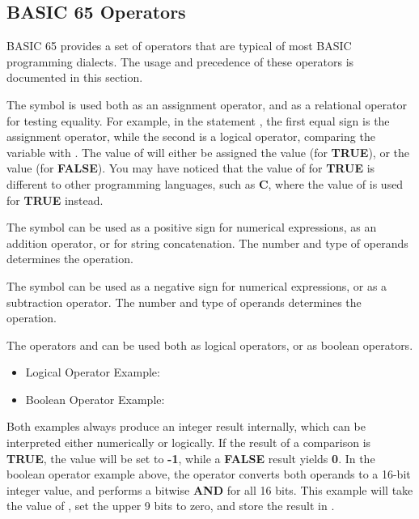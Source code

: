 \subsection{BASIC 65 Operators}

BASIC 65 provides a set of operators that are typical of most BASIC
programming dialects. The usage and precedence of these operators is documented in this section.

The \screentext{=} symbol is used both as an assignment operator, and as a relational
operator for testing equality. For example, in the statement
, the first equal sign is the assignment operator,
while the second is a logical operator, comparing the variable  with .
The value of  will either be assigned the value  (for {\bf TRUE}), or
the value  (for {\bf FALSE}).
You may have noticed that the value of  for {\bf TRUE} is different to
other programming languages, such as {\bf C}, where the value of 
is used for {\bf TRUE} instead.

The \screentext{+} symbol can be used as a positive sign for numerical expressions,
as an addition operator, or for string concatenation. The number and type of operands
determines the operation.

The \screentext{-} symbol can be used as a negative sign for numerical expressions,
or as a subtraction operator. The number and type of operands
determines the operation.

The operators  and  can be used both as
logical operators, or as boolean operators.

\begin{itemize}
  \item Logical Operator Example: 
  \item Boolean Operator Example: 
\end{itemize}

Both examples always produce an integer result internally, which can be interpreted
either numerically or logically.
If the result of a comparison is {\bf TRUE}, the value will be set
to {\bf -1}, while a {\bf FALSE} result yields {\bf 0}.
In the boolean operator example above, the  operator converts both operands
to a 16-bit integer value, and performs a bitwise {\bf AND} for all 16 bits.
This example will take the value of , set the upper 9 bits to zero,
and store the result in .

